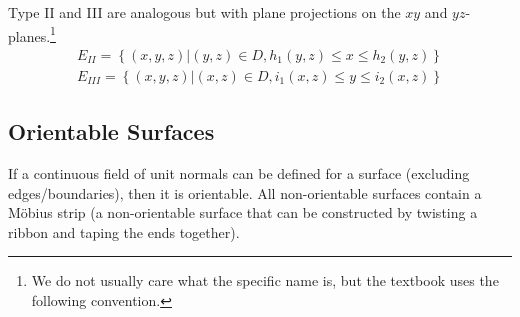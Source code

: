 \documentclass{article}
\begin{document}
Type II and III are analogous but with plane projections on the $xy$ and $yz$-planes.\footnote{We do not usually care what the specific name is, but the textbook uses the following convention.}
\begin{align*}
E_{II}=\left\{(x,y,z)|(y,z)\in D, h_1(y,z)\le x \le h_2(y,z)\right\}\\
E_{III}=\left\{(x,y,z)|(x,z)\in D, i_1(x,z)\le y \le i_2(x,z)\right\}
\end{align*}

\subsection{Orientable Surfaces}
If a continuous field of unit normals can be defined for a surface (excluding edges/boundaries), then it is orientable. All non-orientable surfaces contain a Möbius strip (a non-orientable surface that can be constructed by twisting a ribbon and taping the ends together).
\end{document}
